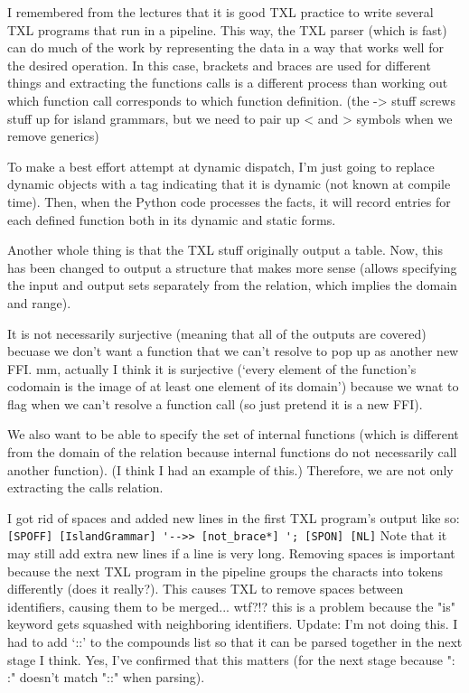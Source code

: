 \documentclass[11pt]{article}
\begin{document}
I remembered from the lectures that it is good TXL practice to write several TXL programs that run in a pipeline.
This way, the TXL parser (which is fast) can do much of the work by representing the data in a way that works well for the desired operation.
In this case, brackets and braces are used for different things and extracting the functions calls is a different process than working out which function call corresponds to which function definition.
(the -> stuff screws stuff up for island grammars, but we need to pair up < and > symbols when we remove generics)

To make a best effort attempt at dynamic dispatch, I'm just going to replace dynamic objects with a tag indicating that it is dynamic (not known at compile time).
Then, when the Python code processes the facts, it will record entries for each defined function both in its dynamic and static forms.

Another whole thing is that the TXL stuff originally output a table.
Now, this has been changed to output a structure that makes more sense (allows specifying the input and output sets separately from the relation, which implies the domain and range).

It is not necessarily surjective (meaning that all of the outputs are covered) becuase we don't want a function that we can't resolve to pop up as another new FFI.
mm, actually I think it is surjective (`every element of the function's codomain is the image of at least one element of its domain') because we wnat to flag when we can't resolve a function call (so just pretend it is a new FFI).

We also want to be able to specify the set of internal functions (which is different from the domain of the relation because internal functions do not necessarily call another function).
(I think I had an example of this.)
Therefore, we are not only extracting the calls relation.

I got rid of spaces and added new lines in the first TXL program's output like so:
\lstinline{[SPOFF] [IslandGrammar] '-->> [not_brace*] '; [SPON] [NL]}
Note that it may still add extra new lines if a line is very long.
Removing spaces is important because the next TXL program in the pipeline groups the characts into tokens differently (does it really?).
This causes TXL to remove spaces between identifiers, causing them to be merged... wtf?!?
    this is a problem because the "is" keyword gets squashed with neighboring identifiers.
Update:
I'm not doing this.
I had to add `::' to the compounds list so that it can be parsed together in the next stage I think.
    Yes, I've confirmed that this matters (for the next stage because ": :" doesn't match "::" when parsing).
\end{document}
